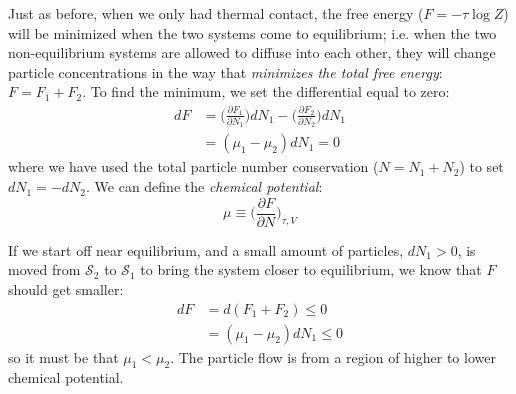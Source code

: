 Just as before, when we only had thermal contact, the 
free energy ($F = -\tau \log{Z}$) will be minimized when the two
systems come to equilibrium; i.e. when the two non-equilibrium
systems are allowed to diffuse into each other, they will change
particle concentrations in the way that \textit{minimizes the total
free energy}: $F = F_1 + F_2$. To find the minimum, we set the differential equal to zero:
\begin{align}
dF &= \bigg(\frac{\partial F_1}{\partial N_1}\bigg) dN_1
	- \bigg(\frac{\partial F_2}{\partial N_2}\bigg) dN_1 \\
   &= (\mu_1 - \mu_2) dN_1 = 0
\end{align}
where we have used the total particle number conservation ($N = N_1 + N_2$)
to set $dN_1 = -dN_2$. We can define the \textit{chemical potential}:
\begin{equation}
\boxed{\mu \equiv \bigg(\frac{\partial F}{\partial N}\bigg)_{\tau,V}}
\label{eq:ChemPot}
\end{equation}

If we start off near equilibrium, and a small amount of particles, 
$dN_1 > 0$, is moved from $\mathcal{S}_2$ to $\mathcal{S}_1$ to
bring the system closer to equilibrium, we know that $F$ should get smaller:
\begin{align}
dF &= d(F_1 + F_2) \le 0 \\
   &= (\mu_1 - \mu_2) dN_1 \le 0
\end{align}
so it must be that $\mu_1 < \mu_2$. The particle flow is from a region of
higher to lower chemical potential.









